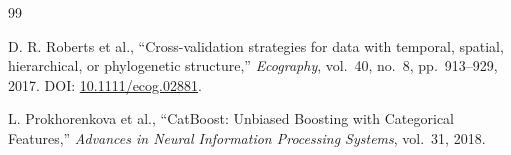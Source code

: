 \documentclass[10pt,a4paper]{article}
\begin{document}
	
	\begin{thebibliography}{99}
		
		D. R. Roberts et al.,
		\newblock ``Cross-validation strategies for data with temporal,
		spatial, hierarchical, or phylogenetic structure,''
		\newblock \emph{Ecography}, vol.~40, no.~8, pp.~913--929, 2017.
		\newblock DOI:
		\href{https://doi.org/10.1111/ecog.02881}
		{10.1111/ecog.02881}.
		
		L. Prokhorenkova et al.,
		\newblock ``CatBoost: Unbiased Boosting with Categorical Features,''
		\newblock \emph{Advances in Neural Information Processing Systems},
		vol.~31, 2018.
		

		
	\end{thebibliography}
	
\end{document}
